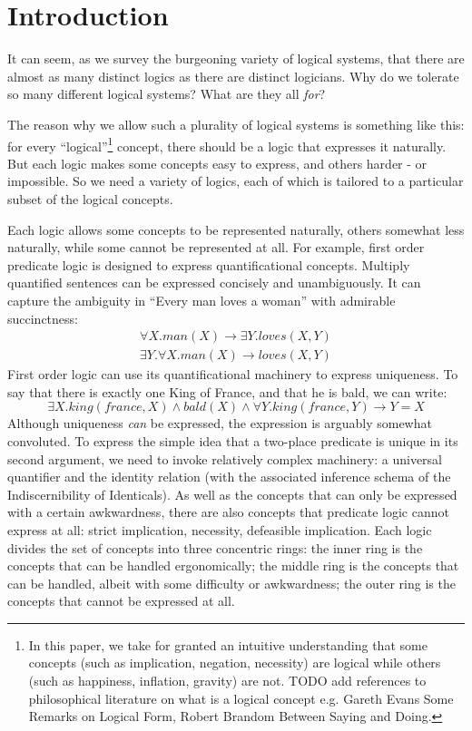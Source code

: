\section{Introduction}\label{introduction}

It can seem, as we survey the burgeoning variety of logical systems, that there are almost as many distinct logics as there are distinct logicians.
Why do we tolerate so many different logical systems?
What are they all \emph{for}?

The reason why we allow such a plurality of logical systems is something like this: 
for every ``logical''\footnote{In this paper, we take for granted an intuitive understanding that some concepts (such as implication, negation, necessity) are logical while others (such as happiness, inflation, gravity) are not. TODO add references to philosophical literature on what is a logical concept e.g. Gareth Evans Some Remarks on Logical Form, Robert Brandom Between Saying and Doing.} concept, there should be a logic that expresses it naturally.
But each logic makes some concepts easy to express, and others harder - or impossible.
So we need a variety of logics, each of which is tailored to a particular subset of the logical concepts.

Each logic allows some concepts to be represented naturally, others somewhat less naturally, while some cannot be represented at all.
For example, first order predicate logic is designed to express quantificational concepts.
Multiply quantified sentences can be expressed concisely and unambiguously.
It can capture the ambiguity in ``Every man loves a woman'' with admirable succinctness:
\begin{eqnarray}
\forall X. man(X) \rightarrow \exists Y . loves(X,Y) \nonumber \\
\exists Y. \forall X. man(X) \rightarrow loves(X,Y) \nonumber
\end{eqnarray}
First order logic can use its quantificational machinery to express uniqueness. 
To say that there is exactly one King of France, and that he is bald, we can write:
\[
\exists X. king(france, X) \land bald(X) \land \forall Y. king(france, Y) \rightarrow Y = X
\]
Although uniqueness \emph{can} be expressed, the expression is arguably somewhat convoluted. 
To express the simple idea that a two-place predicate is unique in its second argument, we need to invoke relatively complex machinery: a universal quantifier and the identity relation (with the associated inference schema of the Indiscernibility of Identicals).
As well as the concepts that can only be expressed with a certain awkwardness, there are also concepts that predicate logic cannot express at all: strict implication, necessity, defeasible implication.
Each logic divides the set of concepts into three concentric rings: the inner ring is the concepts that can be handled ergonomically; the middle ring is the concepts that can be handled, albeit with some difficulty or awkwardness; the outer ring is the concepts that cannot be expressed at all.



